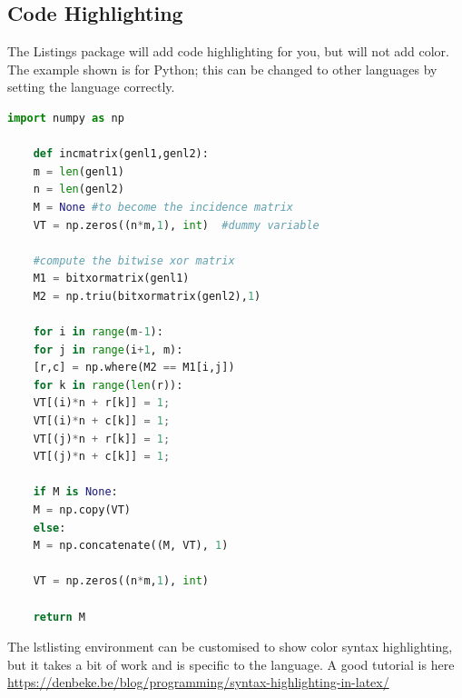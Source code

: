 \subsection{Code Highlighting}

The Listings package will add code highlighting for you, but will not add color. The example shown is for Python; this can be changed to other languages by setting the language correctly.


\begin{lstlisting}[language=Python]
	import numpy as np
	
	def incmatrix(genl1,genl2):
	m = len(genl1)
	n = len(genl2)
	M = None #to become the incidence matrix
	VT = np.zeros((n*m,1), int)  #dummy variable
	
	#compute the bitwise xor matrix
	M1 = bitxormatrix(genl1)
	M2 = np.triu(bitxormatrix(genl2),1) 
	
	for i in range(m-1):
	for j in range(i+1, m):
	[r,c] = np.where(M2 == M1[i,j])
	for k in range(len(r)):
	VT[(i)*n + r[k]] = 1;
	VT[(i)*n + c[k]] = 1;
	VT[(j)*n + r[k]] = 1;
	VT[(j)*n + c[k]] = 1;
	
	if M is None:
	M = np.copy(VT)
	else:
	M = np.concatenate((M, VT), 1)
	
	VT = np.zeros((n*m,1), int)
	
	return M
\end{lstlisting}

The lstlisting environment can be customised to show color syntax highlighting, but it takes a bit of work and is specific to the language.  A good tutorial is here \href{https://denbeke.be/blog/programming/syntax-highlighting-in-latex/}{https://denbeke.be/blog/programming/syntax-highlighting-in-latex/}


